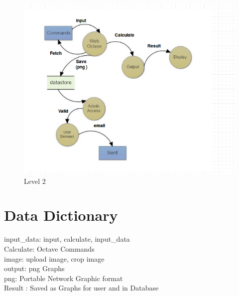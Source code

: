 \begin{figure}[!th]
\centering
\includegraphics[width=0.9\linewidth]{input/images/dfdf.png}
\caption{Level 2}
\label{fig:image1}
\end{figure} 

\section*{Data Dictionary}
input\_data: input, calculate, input\_data\\
Calculate: Octave Commands\\
image: upload image, crop image\\
output: png Graphs\\
png: Portable Network Graphic format\\
Result : Saved as Graphs for user and in Database\\



 


